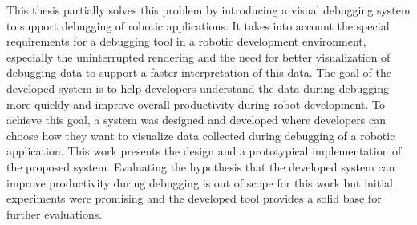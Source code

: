 \documentclass[12pt,a4paper,headsepline,footsepline,DIV13,BCOR12mm]{scrbook}
\begin{document}
This thesis partially solves this problem by introducing a visual debugging system to support debugging of robotic applications: It takes into account the special requirements for a debugging tool in a robotic development environment, especially the uninterrupted rendering and the need for better visualization of debugging data to support a faster interpretation of this data. The goal of the developed system is to help developers understand the data during debugging more quickly and improve overall productivity during robot development. To achieve this goal, a system was designed and developed where developers can choose how they want to visualize data collected during debugging of a robotic application. This work presents the design and a prototypical implementation of the proposed system. Evaluating the hypothesis that the developed system can improve productivity during debugging is out of scope for this work but initial experiments were promising and the developed tool provides a solid base for further evaluations.
\newpage


\tableofcontents
\newpage
\listoffigures
\newpage
\lstlistoflistings











\appendix

\end{document}
